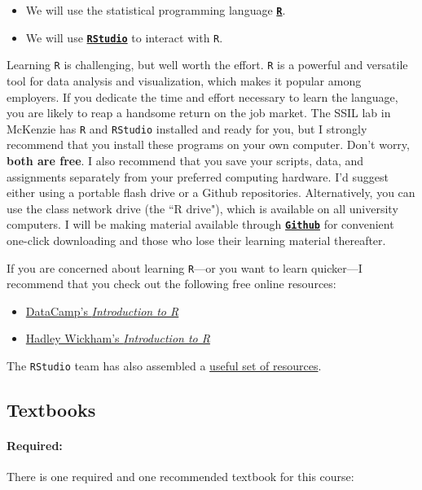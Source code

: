\documentclass[10pt]{article}
\begin{document}
\begin{itemize}
	\item We will use the statistical programming language \href{https://www.r-project.org/}{\textbf{\texttt{R}}}.
	\item We will use \href{https://www.rstudio.com}{\textbf{\texttt{RStudio}}} to interact with \texttt{R}.
\end{itemize}
Learning \texttt{R} is challenging, but well worth the effort. \texttt{R} is a powerful and versatile tool for data analysis and visualization, which makes it popular among employers. If you dedicate the time and effort necessary to learn the language, you are likely to reap a handsome return on the job market. The SSIL lab in McKenzie has \texttt{R} and \texttt{RStudio} installed and ready for you, but I strongly recommend that you install these programs on your own computer. Don't worry, \textbf{both are free}. I also recommend that you save your scripts, data, and assignments separately from your preferred computing hardware. I'd suggest either using a portable flash drive or a Github repositories. Alternatively, you can use the class network drive (the ``R drive"), which is available on all university computers. I will be making material available through \href{https://github.com/peconomi/EC320_Econometrics}{\textbf{\texttt{Github}}} for convenient one-click downloading and those who lose their learning material thereafter. 

If you are concerned about learning \texttt{R}---or you want to learn quicker---I recommend that you check out the following free online resources:
\begin{itemize}
	\item \href{https://www.datacamp.com/courses/free-introduction-to-r}{DataCamp's \textit{Introduction to R}}
	\item \href{https://r4ds.had.co.nz/introduction.html}{Hadley Wickham's \textit{Introduction to R}}
\end{itemize}
The \texttt{RStudio} team has also assembled a \href{https://www.rstudio.com/online-learning/}{useful set of resources}.

\bigskip

\subsection*{Textbooks}

\paragraph{Required:} There is one required and one recommended textbook for this course:
\end{document}
